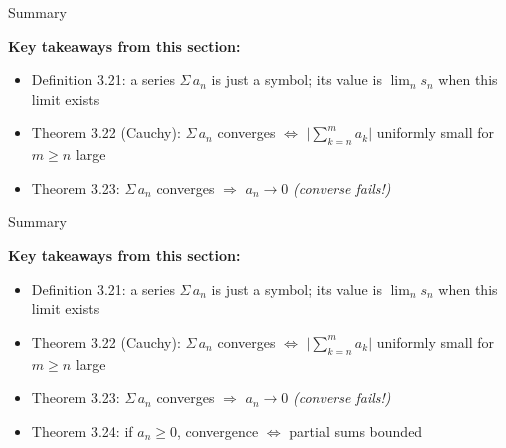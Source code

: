 \documentclass[aspectratio=169,12pt,t]{beamer}
\begin{document}
{%
\begin{frame}{Summary}
  \begin{hlbox}
    \textbf{Key takeaways from this section:}
    \begin{itemize}
      \item \alert{Definition 3.21:} a series $\Sigma\, a_n$ is just a
        symbol; its value is $\lim_{n} s_n$ when this limit exists
      \item \alert{Theorem 3.22 (Cauchy):}
        $\Sigma\, a_n$ converges $\iff$
        $\bigl|\sum_{k=n}^{m} a_k\bigr|$ uniformly small for
        $m \geq n$ large
      \item \alert{Theorem 3.23:} $\Sigma\, a_n$ converges
        $\Longrightarrow$ $a_n \to 0$
        \emph{(converse fails!)}
    \end{itemize}
  \end{hlbox}

\end{frame}

\begin{frame}{Summary}
  \begin{hlbox}
    \textbf{Key takeaways from this section:}
    \begin{itemize}
      \item \alert{Definition 3.21:} a series $\Sigma\, a_n$ is just a
        symbol; its value is $\lim_{n} s_n$ when this limit exists
      \item \alert{Theorem 3.22 (Cauchy):}
        $\Sigma\, a_n$ converges $\iff$
        $\bigl|\sum_{k=n}^{m} a_k\bigr|$ uniformly small for
        $m \geq n$ large
      \item \alert{Theorem 3.23:} $\Sigma\, a_n$ converges
        $\Longrightarrow$ $a_n \to 0$
        \emph{(converse fails!)}
      \item \alert{Theorem 3.24:} if $a_n \geq 0$, convergence
        $\iff$ partial sums bounded
    \end{itemize}
  \end{hlbox}


\end{frame}}
\end{document}
